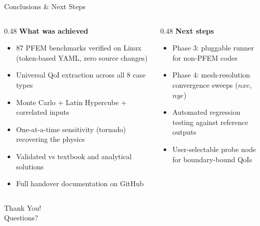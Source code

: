 \documentclass[aspectratio=169]{beamer}
\begin{document}
\begin{frame}[shrink=15]{Conclusions \& Next Steps}
    \begin{columns}[t]
        \begin{column}{0.48\textwidth}
            \textbf{What was achieved}
            \begin{itemize}
                \setlength\itemsep{0.4em}
                \item[\textcolor{tugreen}{\ding{51}}] 87 PFEM benchmarks verified on Linux (token-based YAML, zero source changes)
                \item[\textcolor{tugreen}{\ding{51}}] Universal QoI extraction across all 8 case types
                \item[\textcolor{tugreen}{\ding{51}}] Monte Carlo + Latin Hypercube + correlated inputs
                \item[\textcolor{tugreen}{\ding{51}}] One-at-a-time sensitivity (tornado) recovering the physics
                \item[\textcolor{tugreen}{\ding{51}}] Validated vs textbook and analytical solutions
                \item[\textcolor{tugreen}{\ding{51}}] Full handover documentation on GitHub
            \end{itemize}
        \end{column}
        \begin{column}{0.48\textwidth}
            \textbf{Next steps}
            \begin{itemize}
                \setlength\itemsep{0.45em}
                \item Phase 3: pluggable runner for non-PFEM codes
                \item Phase 4: mesh-resolution convergence sweeps ($nxe$, $nye$)
                \item Automated regression testing against reference outputs
                \item User-selectable probe node for boundary-bound QoIs
            \end{itemize}
        \end{column}
    \end{columns}
\end{frame}

\begin{frame}
    \centering
    \vspace{2.5cm}
    {\Huge Thank You!}\\[1cm]
    {\large Questions?}
\end{frame}
\end{document}

